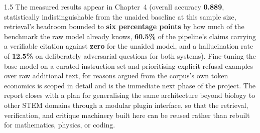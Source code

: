 \begin{spacing}{1.5}
The measured results appear in Chapter~4 (overall accuracy \textbf{0.889},
statistically indistinguishable from the unaided baseline at this sample
size,
retrieval's headroom bounded to \textbf{six percentage points} by how much
of the benchmark the raw model already knows, \textbf{60.5\%} of the
pipeline's claims carrying a verifiable citation against \textbf{zero} for
the unaided model, and a hallucination rate of \textbf{12.5\%} on
deliberately adversarial questions for both systems). Fine-tuning the base
model on a curated instruction set and prioritising explicit refusal
examples over raw additional text, for reasons argued from the corpus's own
token economics is scoped in detail and is the immediate next phase of the
project. The
report closes with a plan for generalising the same architecture beyond
biology to other STEM domains through a modular plugin interface, so that
the retrieval, verification, and critique machinery built here can be reused
rather than rebuilt for mathematics, physics, or coding.

\end{spacing}
